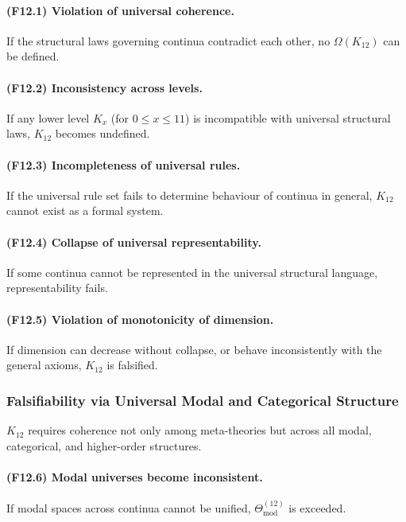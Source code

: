 \paragraph{(F12.1) Violation of universal coherence.}
If the structural laws governing continua contradict each other,
no $\Omega(K_{12})$ can be defined.

\paragraph{(F12.2) Inconsistency across levels.}
If any lower level $K_x$ (for $0 \le x \le 11$) is incompatible with
universal structural laws, $K_{12}$ becomes undefined.

\paragraph{(F12.3) Incompleteness of universal rules.}
If the universal rule set fails to determine behaviour of continua
in general, $K_{12}$ cannot exist as a formal system.

\paragraph{(F12.4) Collapse of universal representability.}
If some continua cannot be represented in the universal structural
language, representability fails.

\paragraph{(F12.5) Violation of monotonicity of dimension.}
If dimension can decrease without collapse, or behave inconsistently
with the general axioms, $K_{12}$ is falsified.



\subsubsection{Falsifiability via Universal Modal and Categorical Structure}

$K_{12}$ requires coherence not only among meta-theories but across all
modal, categorical, and higher-order structures.

\paragraph{(F12.6) Modal universes become inconsistent.}
If modal spaces across continua cannot be unified,  
$\Theta_{\mathrm{mod}}^{(12)}$ is exceeded.

